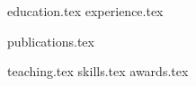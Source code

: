 \documentclass[letterpaper,11pt]{article}
\begin{document}


{education.tex}
{experience.tex}

{publications.tex}

{teaching.tex}
{skills.tex}
{awards.tex}
\end{document}
